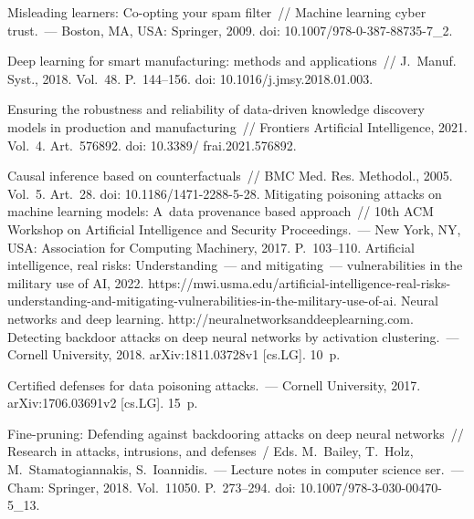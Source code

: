 \begin{multicols}{2}
{{\begin{thebibliography}{99}
 Misleading learners: Co-opting your spam filter~// Machine learning cyber trust.~--- 
Boston, MA, USA: Springer, 2009. doi: 10.1007/978-0-387-88735-7\_2.

 Deep learning for smart manufacturing: methods 
and applications~// J.~Manuf. Syst., 2018. Vol.~48. P.~144--156. doi: 
10.1016/j.jmsy.2018.01.003.

 Ensuring the 
robustness and reliability of data-driven knowledge discovery models in production and 
manufacturing~// Frontiers Artificial Intelligence, 2021. Vol.~4. Art.~576892. doi: 10.3389/ frai.2021.576892.

 Causal inference based on counterfactuals~// BMC Med. Res. 
Methodol., 2005. Vol.~5. Art.~28. doi: 10.1186/1471-2288-5-28.
 Mitigating poisoning attacks on machine 
learning models: A~data provenance based approach~// 10th ACM Workshop on Artificial 
Intelligence and Security Proceedings.~--- New York, NY, USA: Association for Computing 
Machinery, 2017. P.~103--110.
 Artificial intelligence, real risks: Understanding~--- and 
mitigating~--- vulnerabilities in the military use of AI, 2022. {\sf  
https://mwi.usma.\linebreak edu/artificial-intelligence-real-risks-understanding-and-mitigating-vulnerabilities-in-the-military-use-of-ai}.
 Neural networks and deep learning. {\sf http://\linebreak neuralnetworksanddeeplearning.com}.
 Detecting backdoor attacks on deep neural networks by activation clustering.~--- Cornell 
University, 2018. arXiv:1811.03728v1 [cs.LG]. 10~p.

 Certified defenses for data poisoning attacks.~--- Cornell 
University, 2017. arXiv:1706.03691v2 [cs.LG]. 15~p.

 Fine-pruning: Defending against backdooring attacks on deep 
neural networks~// Research in attacks, intrusions, and defenses~/ Eds. M.~Bailey, 
T.~Holz, M.~Stamatogiannakis, S.~Ioannidis.~--- Lecture notes in computer science ser.~--- Cham: 
Springer, 2018. Vol.~11050. P.~273--294. doi: 10.1007/978-3-030-00470-5\_13.

\end{thebibliography}

 }
 }

\end{multicols}

